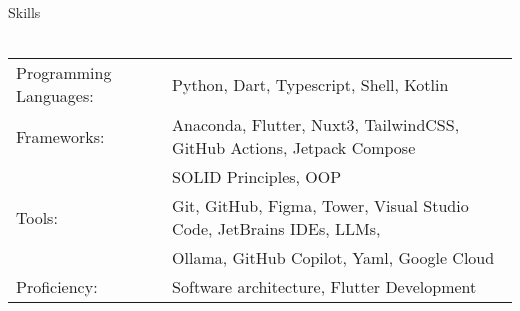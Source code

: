 \documentclass[a4paper, 11pt]{article}
\newcommand{\lineunder} {
    \vspace*{-8pt} \\
    \hspace*{-18pt} \hrulefill \\
}
\newcommand{\header} [1] {
    \vspace*{6mm}
    {\hspace*{-18pt}\vspace*{6pt} #1}
    \vspace*{-6pt} \lineunder
}
\begin{document}
\header{Skills}
\vspace*{6mm}
\begin{tabular}{ l l }
    Programming Languages: & Python, Dart, Typescript, Shell, Kotlin                          \\
    Frameworks:            & Anaconda, Flutter, Nuxt3, TailwindCSS, GitHub Actions, Jetpack Compose         \\ & SOLID Principles, OOP \\
    Tools:                 & Git, GitHub, Figma, Tower, Visual Studio Code, JetBrains IDEs, LLMs, \\ & Ollama, GitHub Copilot, Yaml, Google Cloud \\
    Proficiency:  & Software architecture, Flutter Development                     \\
\end{tabular}
\end{document}
